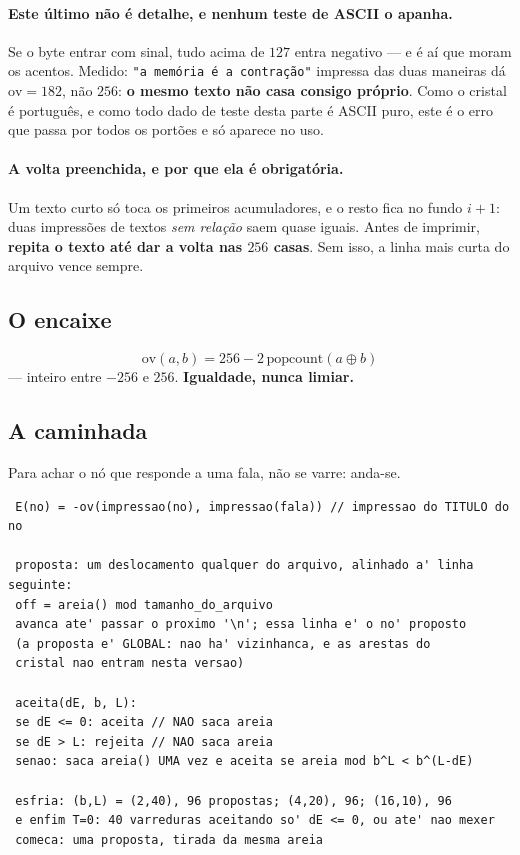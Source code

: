 \documentclass[11pt]{article}
\newcommand{\code}[1]{\texttt{\small #1}}
\theoremstyle{plain}
\theoremstyle{remark}
\begin{document}
\paragraph{Este último não é detalhe, e nenhum teste de ASCII o apanha.} Se o
byte entrar com sinal, tudo acima de $127$ entra negativo --- e é aí que moram
os acentos. Medido: \code{"a memória é a contração"} impressa das duas
maneiras dá $\mathrm{ov}=182$, não $256$: \textbf{o mesmo texto não casa
consigo próprio}. Como o cristal é português, e como todo dado de teste desta
parte é ASCII puro, este é o erro que passa por todos os portões e só aparece
no uso.

\paragraph{A volta preenchida, e por que ela é obrigatória.} Um texto curto só
toca os primeiros acumuladores, e o resto fica no fundo $i+1$: duas impressões
de textos \emph{sem relação} saem quase iguais. Antes de imprimir,
\textbf{repita o texto até dar a volta nas $256$ casas}. Sem isso, a linha mais
curta do arquivo vence sempre.

\subsection{O encaixe}

\[
\mathrm{ov}(a,b)=256-2\,\mathrm{popcount}(a\oplus b)
\]
--- inteiro entre $-256$ e $256$. \textbf{Igualdade, nunca limiar.}

\subsection{A caminhada}

Para achar o nó que responde a uma fala, não se varre: anda-se.

\begin{verbatim}
 E(no) = -ov(impressao(no), impressao(fala)) // impressao do TITULO do no

 proposta: um deslocamento qualquer do arquivo, alinhado a' linha seguinte:
 off = areia() mod tamanho_do_arquivo
 avanca ate' passar o proximo '\n'; essa linha e' o no' proposto
 (a proposta e' GLOBAL: nao ha' vizinhanca, e as arestas do
 cristal nao entram nesta versao)

 aceita(dE, b, L):
 se dE <= 0: aceita // NAO saca areia
 se dE > L: rejeita // NAO saca areia
 senao: saca areia() UMA vez e aceita se areia mod b^L < b^(L-dE)

 esfria: (b,L) = (2,40), 96 propostas; (4,20), 96; (16,10), 96
 e enfim T=0: 40 varreduras aceitando so' dE <= 0, ou ate' nao mexer
 comeca: uma proposta, tirada da mesma areia
\end{verbatim}
\end{document}
